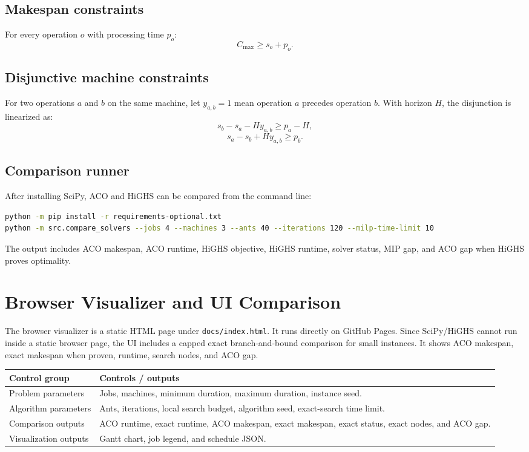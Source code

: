 \documentclass[11pt]{article}
\begin{document}
\subsection{Makespan constraints} For every operation $o$ with processing time $p_o$: \[C_{\max}\geq s_o+p_o.\]
\subsection{Disjunctive machine constraints} For two operations $a$ and $b$ on the same machine, let $y_{a,b}=1$ mean operation $a$ precedes operation $b$. With horizon $H$, the disjunction is linearized as: \[s_b-s_a-Hy_{a,b}\geq p_a-H,\] \[s_a-s_b+Hy_{a,b}\geq p_b.\]
\subsection{Comparison runner} After installing SciPy, ACO and HiGHS can be compared from the command line:
\begin{lstlisting}[language=bash]
python -m pip install -r requirements-optional.txt
python -m src.compare_solvers --jobs 4 --machines 3 --ants 40 --iterations 120 --milp-time-limit 10
\end{lstlisting}
The output includes ACO makespan, ACO runtime, HiGHS objective, HiGHS runtime, solver status, MIP gap, and ACO gap when HiGHS proves optimality.
\section{Browser Visualizer and UI Comparison}
The browser visualizer is a static HTML page under \texttt{docs/index.html}. It runs directly on GitHub Pages. Since SciPy/HiGHS cannot run inside a static browser page, the UI includes a capped exact branch-and-bound comparison for small instances. It shows ACO makespan, exact makespan when proven, runtime, search nodes, and ACO gap.
\begin{longtable}{p{2in}p{4.25in}}\toprule\textbf{Control group} & \textbf{Controls / outputs} \\ \midrule
Problem parameters & Jobs, machines, minimum duration, maximum duration, instance seed. \\
Algorithm parameters & Ants, iterations, local search budget, algorithm seed, exact-search time limit. \\
Comparison outputs & ACO runtime, exact runtime, ACO makespan, exact makespan, exact status, exact nodes, and ACO gap. \\
Visualization outputs & Gantt chart, job legend, and schedule JSON. \\
\bottomrule\end{longtable}
\end{document}
